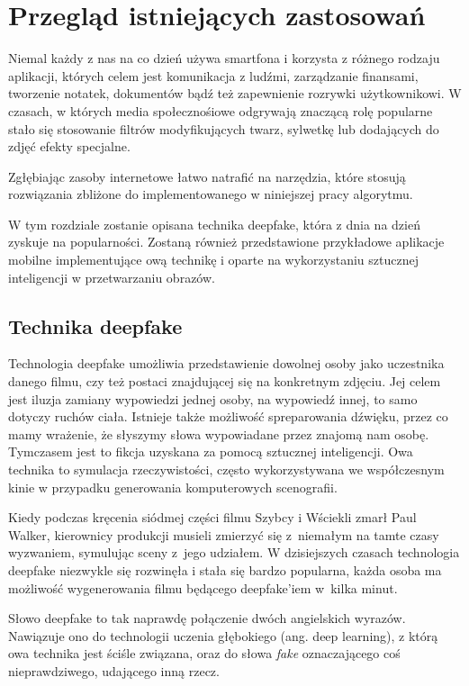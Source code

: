 \chapter{Przegląd istniejących zastosowań}

Niemal każdy z nas na co dzień używa smartfona i korzysta z różnego rodzaju aplikacji, których celem jest komunikacja z ludźmi, zarządzanie finansami, tworzenie notatek, dokumentów bądź też zapewnienie rozrywki użytkownikowi. W czasach, w których media społecznośiowe odgrywają znaczącą rolę popularne stało się stosowanie filtrów modyfikujących twarz, sylwetkę lub dodających do zdjęć efekty specjalne. 

Zgłębiając zasoby internetowe łatwo natrafić na narzędzia, które stosują rozwiązania zbliżone do implementowanego w niniejszej pracy algorytmu.

W tym rozdziale zostanie opisana technika deepfake, która z dnia na dzień zyskuje na popularności. Zostaną również przedstawione przykładowe aplikacje mobilne implementujące ową technikę i oparte na wykorzystaniu sztucznej inteligencji w przetwarzaniu obrazów. 


\section{Technika deepfake}
Technologia deepfake umożliwia przedstawienie dowolnej osoby jako uczestnika danego filmu, czy też postaci znajdującej się na konkretnym zdjęciu. Jej celem jest iluzja zamiany wypowiedzi jednej osoby, na wypowiedź innej, to samo dotyczy ruchów ciała. Istnieje także możliwość spreparowania dźwięku, przez co mamy wrażenie, że słyszymy słowa wypowiadane przez znajomą nam osobę. Tymczasem jest to fikcja uzyskana za pomocą sztucznej inteligencji. Owa technika to symulacja rzeczywistości, często wykorzystywana we współczesnym kinie w przypadku generowania komputerowych scenografii.

Kiedy podczas kręcenia siódmej części filmu Szybcy i Wściekli zmarł Paul Walker, kierownicy produkcji musieli zmierzyć się z~niemałym na tamte czasy wyzwaniem, symulując sceny z~jego udziałem. W dzisiejszych czasach technologia deepfake niezwykle się rozwinęła i stała się bardzo popularna, każda osoba ma możliwość wygenerowania filmu będącego deepfake'iem w~kilka minut.

Słowo deepfake to tak naprawdę połączenie dwóch angielskich wyrazów. Nawiązuje ono do technologii uczenia głębokiego (ang. deep learning), z którą owa technika jest ściśle związana, oraz do słowa \textit{fake} oznaczającego coś nieprawdziwego, udającego inną rzecz.

